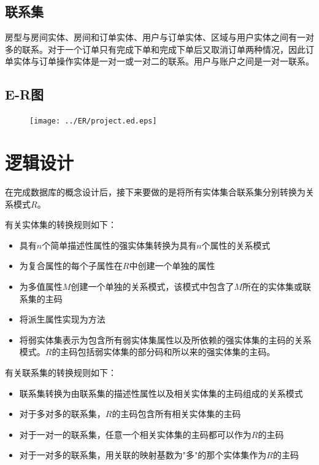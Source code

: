 \documentclass{myreport}
\begin{document}
\subsection{联系集}
房型与房间实体、房间和订单实体、用户与订单实体、区域与用户实体之间有一对多的联系。对于一个订单只有完成下单和完成下单后又取消订单两种情况，因此订单实体与订单操作实体是一对一或一对二的联系。用户与账户之间是一对一联系。
\subsection{E-R图}

\begin{figure}[H]
	\centering
	\texttt{[image: ../ER/project.ed.eps]}
	\caption{}
	\label{fig:ER Graph}
\end{figure}

\section{逻辑设计}

在完成数据库的概念设计后，接下来要做的是将所有实体集合联系集分别转换为关系模式$R$。

有关实体集的转换规则如下：

\begin{itemize}
	\item 具有$n$个简单描述性属性的强实体集转换为具有$n$个属性的关系模式
	\item 为复合属性的每个子属性在$R$中创建一个单独的属性
	\item 为多值属性$M$创建一个单独的关系模式，该模式中包含了$M$所在的实体集或联系集的主码
	\item 将派生属性实现为方法
	\item 将弱实体集表示为包含所有弱实体集属性以及所依赖的强实体集的主码的关系模式。$R$的主码包括弱实体集的部分码和所以来的强实体集的主码。
\end{itemize}

有关联系集的转换规则如下：

\begin{itemize}
	\item 联系集转换为由联系集的描述性属性以及相关实体集的主码组成的关系模式
	\item 对于多对多的联系集，$R$的主码包含所有相关实体集的主码
	\item 对于一对一的联系集，任意一个相关实体集的主码都可以作为$R$的主码
	\item 对于一对多的联系集，用关联的映射基数为"多"的那个实体集作为$R$的主码
\end{itemize}
\end{document}
